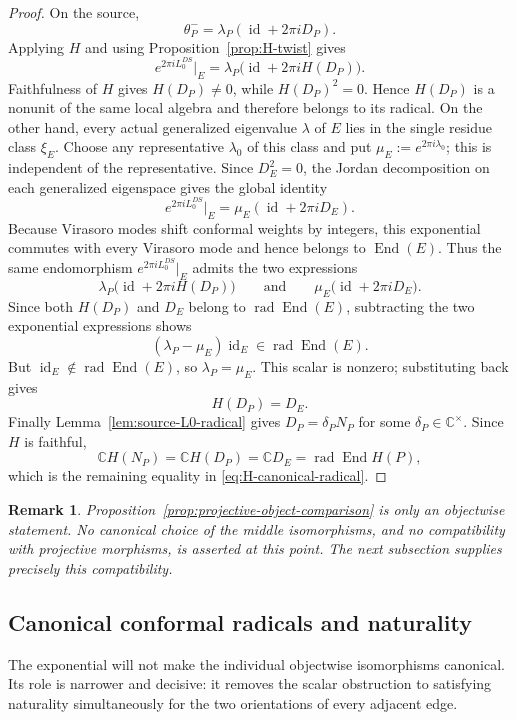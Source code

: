\documentclass[12pt,leqno]{amsart}
\numberwithin{equation}{section}
\newtheorem{rmk}[thm]{Remark}
\newcommand{\End}{\operatorname{End}}
\newcommand{\rad}{\operatorname{rad}}
\newcommand{\id}{\operatorname{id}}
\def\C{\mathbb{C}}
\begin{document}
\begin{proof}
On the source,
\[
 \theta^-_P=\lambda_P(\id+2\pi iD_P).
\]
Applying $H$ and using Proposition~\ref{prop:H-twist} gives
\begin{equation}\label{eq:H-DP-exponential}
 e^{2\pi iL^{DS}_0}|_E
 =\lambda_P\bigl(\id+2\pi iH(D_P)\bigr).
\end{equation}
Faithfulness of $H$ gives $H(D_P)\ne0$, while $H(D_P)^2=0$.  Hence
$H(D_P)$ is a nonunit of the same local algebra and therefore belongs to
its radical.  On the other hand, every actual generalized eigenvalue $\lambda$ of
$E$ lies in the single residue class $\xi_E$.  Choose any representative
$\lambda_0$ of this class and put $\mu_E:=e^{2\pi i\lambda_0}$; this is
independent of the representative.  Since $D_E^2=0$, the Jordan decomposition on
each generalized eigenspace gives the global identity
\[
 e^{2\pi iL^{DS}_0}|_E=\mu_E(\id+2\pi iD_E).
\]
Because Virasoro modes shift conformal weights by integers, this
exponential commutes with every Virasoro mode and hence belongs to
$\End(E)$.  Thus the same endomorphism $e^{2\pi iL^{DS}_0}|_E$ admits the
two expressions
\[
 \lambda_P\bigl(\id+2\pi iH(D_P)\bigr)
 \qquad\text{and}\qquad
 \mu_E\bigl(\id+2\pi iD_E\bigr).
\]
Since both $H(D_P)$ and $D_E$ belong to $\rad\End(E)$, subtracting
the two exponential expressions shows
\[
 (\lambda_P-\mu_E)\id_E\in\rad\End(E).
\]
But $\id_E\notin\rad\End(E)$, so $\lambda_P=\mu_E$.  This scalar
is nonzero; substituting back gives
\[
 H(D_P)=D_E.
\]
Finally Lemma~\ref{lem:source-L0-radical} gives
$D_P=\delta_PN_P$ for some $\delta_P\in\C^\times$.  Since $H$ is
faithful,
\[
 \C H(N_P)=\C H(D_P)=\C D_E=\rad\End H(P),
\]
which is the remaining equality in \eqref{eq:H-canonical-radical}.
\end{proof}

\begin{rmk}\label{rmk:objectwise-not-natural}
Proposition~\ref{prop:projective-object-comparison} is only an objectwise
statement.  No canonical choice of the middle isomorphisms, and no
compatibility with projective morphisms, is asserted at this point.  The
next subsection supplies precisely this compatibility.
\end{rmk}

\subsection{Canonical conformal radicals and naturality}

The exponential will not make the individual objectwise isomorphisms
canonical.  Its role is narrower and decisive: it removes the scalar
obstruction to satisfying naturality simultaneously for the two
orientations of every adjacent edge.
\end{document}
